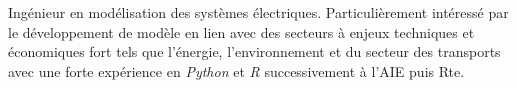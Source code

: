 
\begin{cvparagraph}

Ingénieur en modélisation des systèmes électriques. Particulièrement intéressé par le développement de modèle en lien avec des secteurs à enjeux techniques et économiques fort tels que l'énergie, l'environnement et du secteur des transports avec une forte expérience en \textit{Python} et \textit{R} successivement à l'AIE puis Rte.

\end{cvparagraph}